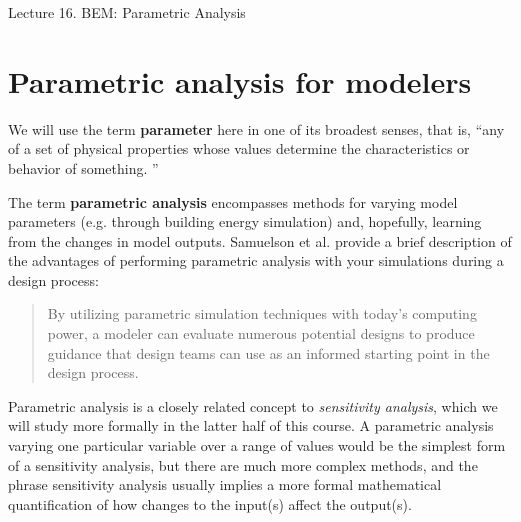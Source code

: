 \documentclass[10pt]{article}
\begin{document}
   \noindent
   \begin{center}

   \hrulefill
   
   \vspace{5pt}
   
   \vspace{0pt}
   
   {\Large \hfill  Lecture 16. BEM: Parametric Analysis}
   \vspace{5pt}
   
  
   \hrulefill
   \end{center}

{}


\section{Parametric analysis for modelers}

We will use the term \textbf{parameter} here in one of its broadest senses, that is, ``any of a set of physical properties whose values determine the characteristics or behavior of something. \cite{noauthor_undated-uq}
''
    
The term \textbf{parametric analysis} encompasses methods for varying model parameters (e.g. through building energy simulation) and, hopefully, learning from the changes in model outputs. Samuelson et al. \cite{Samuelson2016-xw} provide a brief description of the advantages of performing parametric analysis with your simulations during a design process:

\begin{quote}
By utilizing
parametric simulation techniques with today's computing power, a modeler can evaluate numerous potential designs to produce guidance that design teams can use as an informed starting point in the design process. \cite{Samuelson2016-xw}
\end{quote}

Parametric analysis is a closely related concept to \textit{sensitivity analysis}, which we will study more formally in the latter half of this course. A parametric analysis varying one particular variable over a range of values would be the simplest form of a sensitivity analysis, but there are much more complex methods, and the phrase sensitivity analysis usually implies a more formal mathematical quantification of how changes to the input(s) affect the output(s).
\end{document}
